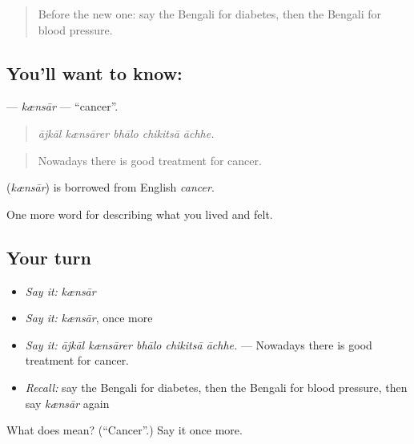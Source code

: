 \label{lesson:BN-C474-kensar}



\begin{quote}
Before the new one: say the Bengali for diabetes, then the Bengali for blood pressure.
\end{quote}

\subsection*{You'll want to know: }
\textbf{} — \emph{kænsār} — \textquotedblleft{}cancer\textquotedblright{}.

\begin{quote}
    
\end{quote}

\begin{quote}
\emph{ājkāl kænsārer bhālo chikitsā āchhe.}
\end{quote}

\begin{quote}
Nowadays there is good treatment for cancer.
\end{quote}

\begin{cousinweb}
\textbf{} (\emph{kænsār}) is borrowed from English \emph{cancer}.
\end{cousinweb}

\begin{grammarlens}[title={What you've built}]
One more word for describing what you lived and felt.
\end{grammarlens}

\subsection*{Your turn}
\begin{itemize}
\raggedright
  \item \emph{Say it:} \emph{kænsār}
  \item \emph{Say it:} \emph{kænsār}, once more
  \item \emph{Say it:} \emph{ājkāl kænsārer bhālo chikitsā āchhe.} — Nowadays there is good treatment for cancer.
  \item \emph{Recall:} say the Bengali for diabetes, then the Bengali for blood pressure, then say \emph{kænsār} again
\end{itemize}

\begin{tcolorbox}[breakable,colback=teal!4,colframe=teal!35!black,title={Before you move on}]
What does  mean? (\textquotedblleft{}Cancer\textquotedblright{}.) Say it once more.
\end{tcolorbox}
